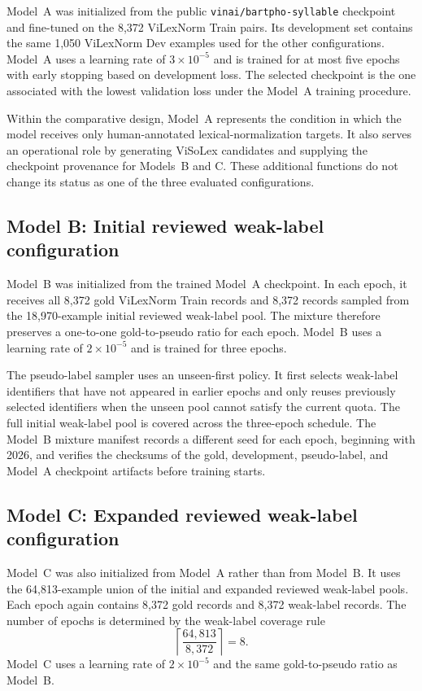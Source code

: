 \documentclass[11pt]{article}
\begin{document}
Model~A was initialized from the public \texttt{vinai/bartpho-syllable} checkpoint and fine-tuned on the 8,372 ViLexNorm Train pairs. Its development set contains the same 1,050 ViLexNorm Dev examples used for the other configurations. Model~A uses a learning rate of $3\times10^{-5}$ and is trained for at most five epochs with early stopping based on development loss. The selected checkpoint is the one associated with the lowest validation loss under the Model~A training procedure.

Within the comparative design, Model~A represents the condition in which the model receives only human-annotated lexical-normalization targets. It also serves an operational role by generating ViSoLex candidates and supplying the checkpoint provenance for Models~B and C. These additional functions do not change its status as one of the three evaluated configurations.

\subsection{Model B: Initial reviewed weak-label configuration}

Model~B was initialized from the trained Model~A checkpoint. In each epoch, it receives all 8,372 gold ViLexNorm Train records and 8,372 records sampled from the 18,970-example initial reviewed weak-label pool. The mixture therefore preserves a one-to-one gold-to-pseudo ratio for each epoch. Model~B uses a learning rate of $2\times10^{-5}$ and is trained for three epochs.

The pseudo-label sampler uses an unseen-first policy. It first selects weak-label identifiers that have not appeared in earlier epochs and only reuses previously selected identifiers when the unseen pool cannot satisfy the current quota. The full initial weak-label pool is covered across the three-epoch schedule. The Model~B mixture manifest records a different seed for each epoch, beginning with 2026, and verifies the checksums of the gold, development, pseudo-label, and Model~A checkpoint artifacts before training starts.

\subsection{Model C: Expanded reviewed weak-label configuration}

Model~C was also initialized from Model~A rather than from Model~B. It uses the 64,813-example union of the initial and expanded reviewed weak-label pools. Each epoch again contains 8,372 gold records and 8,372 weak-label records. The number of epochs is determined by the weak-label coverage rule
\begin{equation}
\left\lceil\frac{64{,}813}{8{,}372}\right\rceil=8.
\end{equation}
Model~C uses a learning rate of $2\times10^{-5}$ and the same gold-to-pseudo ratio as Model~B.
\end{document}
